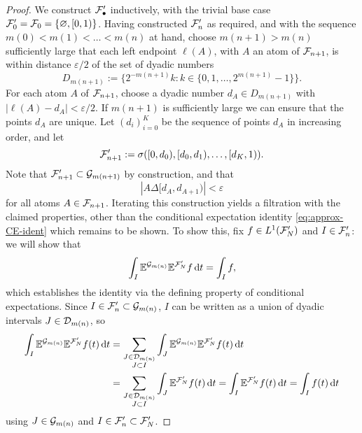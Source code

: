 \begin{proof}
  We construct $\mathcal{F}'_{\bullet}$ inductively, with the trivial base case $\mathcal{F}'_{0} = \mathcal{F}_{0} = \{\varnothing, [0,1)\}$.
  Having constructed $\mathcal{F}'_{n}$ as required, and with the sequence $m(0) < m(1) < \ldots < m(n)$ at hand, choose $m(n+1) > m(n)$ sufficiently large that each left endpoint $\ell(A)$, with $A$ an atom of $\mathcal{F}_{n+1}$, is within distance $\varepsilon/2$ of the set of dyadic numbers
  \begin{equation*}
    D_{m(n+1)} := \{2^{-m(n+1)}k : k \in \{0,1,\ldots,2^{m(n+1)} - 1\}\}.
  \end{equation*}
  For each atom $A$ of $\mathcal{F}_{n+1}$, choose a dyadic number $d_{A} \in D_{m(n+1)}$ with $|\ell(A) - d_{A}| < \varepsilon/2$.
  If $m(n+1)$ is sufficiently large we can ensure that the points $d_{A}$ are unique.
  Let $(d_{i})_{i=0}^{K}$ be the sequence of points $d_{A}$ in increasing order, and let
  \begin{equation*}
    \mathcal{F}'_{n+1} := \sigma([0,d_{0}), [d_{0}, d_{1}), \ldots, [d_{K},1)).
  \end{equation*}
  Note that $\mathcal{F}'_{n+1} \subset \mathcal{G}_{m(n+1)}$ by construction, and that
  \begin{equation*}
    |A \Delta [d_{A}, d_{A+1})| < \varepsilon
  \end{equation*}
  for all atoms $A \in \mathcal{F}_{n+1}$.
  Iterating this construction yields a filtration with the claimed properties, other than the conditional expectation identity \eqref{eq:approx-CE-ident} which remains to be shown.
  To show this, fix $f \in L^1(\mathcal{F}_{N}')$ and $I \in \mathcal{F}_{n}'$: we will show that
  \begin{equation*}
    \int_{I} \mathbb{E}^{\mathcal{G}_{m(n)}} \mathbb{E}^{\mathcal{F}_{N}'} f \, \mathrm{d} t = \int_{I} f,
  \end{equation*}
  which establishes the identity via the defining property of conditional expectations.
  Since $I \in \mathcal{F}_{n}' \subset \mathcal{G}_{m(n)}$, $I$ can be written as a union of dyadic intervals $J \in \mathcal{D}_{m(n)}$, so
  \begin{equation*}
    \begin{aligned}
      \int_{I} \mathbb{E}^{\mathcal{G}_{m(n)}} \mathbb{E}^{\mathcal{F}_{N}'} f(t) \, \mathrm{d} t
      &= \sum_{\substack{J \in \mathcal{D}_{m(n)} \\ J \subset I}} \int_{J} \mathbb{E}^{\mathcal{G}_{m(n)}} \mathbb{E}^{\mathcal{F}_{N}'} f(t) \, \mathrm{d} t \\
      &= \sum_{\substack{J \in \mathcal{D}_{m(n)} \\ J \subset I}} \int_{J} \mathbb{E}^{\mathcal{F}_{N}'} f(t) \, \mathrm{d} t
      = \int_{I} \mathbb{E}^{\mathcal{F}_{N}'} f(t) \, \mathrm{d} t = \int_{I} f(t) \, \mathrm{d} t
    \end{aligned}
  \end{equation*}
  using $J \in \mathcal{G}_{m(n)}$ and $I \in \mathcal{F}_{n}' \subset \mathcal{F}_{N}'$.
\end{proof}

